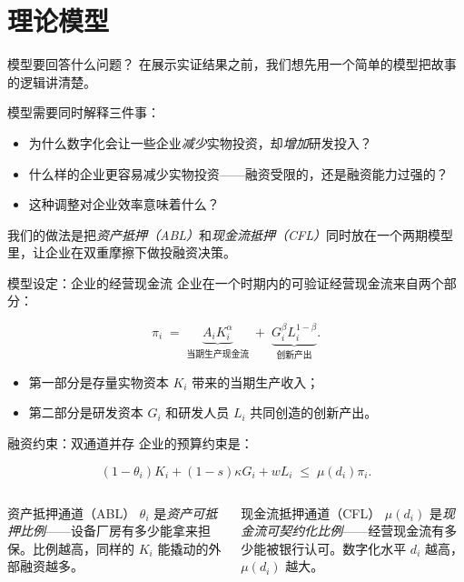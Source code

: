 \section{理论模型}

\begin{frame}{模型要回答什么问题？}
  在展示实证结果之前，我们想先用一个简单的模型把故事的逻辑讲清楚。

  \vspace{0.5em}
  模型需要同时解释三件事：
  \begin{itemize}
    \item 为什么数字化会让一些企业\emph{减少}实物投资，却\emph{增加}研发投入？
    \item 什么样的企业更容易减少实物投资——融资受限的，还是融资能力过强的？
    \item 这种调整对企业效率意味着什么？
  \end{itemize}

  \vspace{0.5em}
  我们的做法是把\emph{资产抵押（ABL）}和\emph{现金流抵押（CFL）}同时放在一个两期模型里，让企业在双重摩擦下做投融资决策。
\end{frame}

\begin{frame}{模型设定：企业的经营现金流}
  企业在一个时期内的可验证经营现金流来自两个部分：

  \[
    \pi_i \;=\; \underbrace{A_i K_i^\alpha}_{\text{当期生产现金流}}
    \;+\;
    \underbrace{G_i^\beta L_i^{1-\beta}}_{\text{创新产出}}.
  \]

  \begin{itemize}
    \item 第一部分是存量实物资本 $K_i$ 带来的当期生产收入；
    \item 第二部分是研发资本 $G_i$ 和研发人员 $L_i$ 共同创造的创新产出。
  \end{itemize}

\end{frame}

\begin{frame}{融资约束：双通道并存}
  企业的预算约束是：

  \[
    (1-\theta_i)K_i + (1-s)\kappa G_i + wL_i
    \;\leq\;
    \mu(d_i)\pi_i.
  \]

  \vspace{0.4em}
  \begin{columns}[T]
      \begin{methodbox}{资产抵押通道（ABL）}
        $\theta_i$ 是\emph{资产可抵押比例}——设备厂房有多少能拿来担保。比例越高，同样的 $K_i$ 能撬动的外部融资越多。
      \end{methodbox}
      \begin{methodbox}{现金流抵押通道（CFL）}
        $\mu(d_i)$ 是\emph{现金流可契约化比例}——经营现金流有多少能被银行认可。数字化水平 $d_i$ 越高，$\mu(d_i)$ 越大。
      \end{methodbox}
  \end{columns}
\end{frame}

